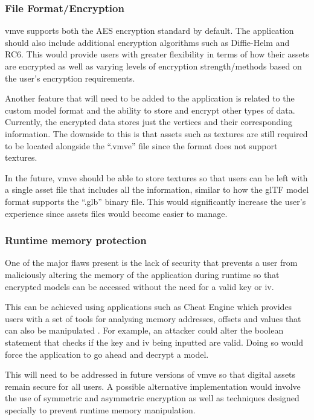 \documentclass[11pt]{article}
\begin{document}
\subsubsection{File Format/Encryption}
\gls*{vmve} supports both the AES encryption standard by default. The application
should also include additional encryption algorithms such as Diffie-Helm and
RC6. This would provide users with greater flexibility in terms of how their
assets are encrypted as well as varying levels of encryption strength/methods
based on the user's encryption requirements.

Another feature that will need to be added to the application is related to the
custom model format and the ability to store and encrypt other types of data.
Currently, the encrypted data stores just the vertices and their corresponding
information. The downside to this is that assets such as textures are still
required to be located alongside the ``.vmve'' file since the format does not
support textures.

In the future, \gls*{vmve} should be able to store textures so that users can be
left with a single asset file that includes all the information, similar to how
the glTF model format supports the ``.glb'' binary file. This would
significantly increase the user's experience since assets files would become
easier to manage.

\subsubsection{Runtime memory protection}
One of the major flaws present is the lack of security that prevents a user from
maliciously altering the memory of the application during runtime so that
encrypted models can be accessed without the need for a valid key or iv.

This can be achieved using applications such as Cheat Engine which provides
users with a set of tools for analysing memory addresses, offsets and values
that can also be manipulated \cite{cheat_engine}. For example, an attacker could
alter the boolean statement that checks if the key and iv being inputted are
valid. Doing so would force the application to go ahead and decrypt a model.

This will need to be addressed in future versions of \gls*{vmve} so that digital
assets remain secure for all users. A possible alternative implementation would
involve the use of symmetric and asymmetric encryption as well as techniques
designed specially to prevent runtime memory manipulation.
\end{document}
